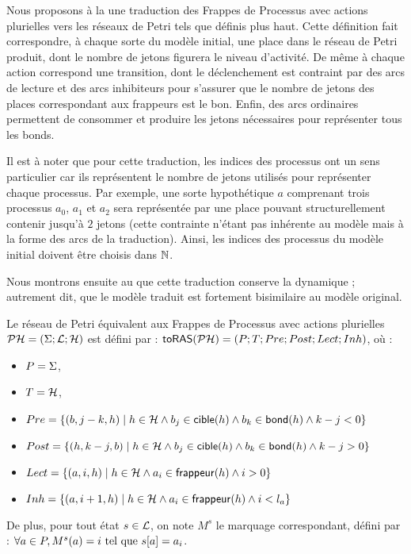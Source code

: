 Nous proposons à la  une traduction des Frappes de Processus avec actions
plurielles vers les réseaux de Petri tels que définis plus haut.
Cette définition fait correspondre, à chaque sorte du modèle initial,
une place dans le réseau de Petri produit,
dont le nombre de jetons figurera le niveau d'activité.
De même à chaque action correspond une transition, dont le déclenchement
est contraint par des arcs de lecture et des arcs inhibiteurs pour s'assurer
que le nombre de jetons des places correspondant aux frappeurs est le bon.
Enfin, des arcs ordinaires permettent de consommer et produire les jetons
nécessaires pour représenter tous les bonds.

Il est à noter que pour cette traduction, les indices des processus ont un sens particulier
car ils représentent le nombre de jetons utilisés pour représenter chaque processus.
Par exemple, une sorte hypothétique $a$ comprenant trois processus $a_0$, $a_1$ et $a_2$
sera représentée par une place pouvant structurellement contenir jusqu'à $2$ jetons
(cette contrainte n'étant pas inhérente au modèle mais à la forme des arcs de la traduction).
Ainsi, les indices des processus du modèle initial doivent être choisis dans $\mathbb{N}$.

Nous montrons ensuite au  que cette traduction
conserve la dynamique ;
autrement dit, que le modèle traduit est fortement bisimilaire au modèle original.

\begin{definition}
  Le réseau de Petri équivalent aux Frappes de Processus
  avec actions plurielles $\mathcal{PH} = (\Sigma; \mathcal{L}; \mathcal{H})$
  est défini par : $\mathsf{toRAS}(\mathcal{PH}) = (P; T; Pre; Post; Lect; Inh)$, où :
  \begin{itemize}
    \item $P = \Sigma$,
    \item $T = \mathcal{H}$,
    \item $Pre = \{ (b, j-k, h) \mid h \in \mathcal{H} \wedge b_j \in \mathsf{cible}(h) \wedge
      b_k \in \mathsf{bond}(h) \wedge k-j < 0 \}$
    \item $Post = \{ (h, k-j, b) \mid h \in \mathcal{H} \wedge b_j \in \mathsf{cible}(h) \wedge
      b_k \in \mathsf{bond}(h) \wedge k-j > 0 \}$
    \item $Lect = \{ (a, i, h) \mid h \in \mathcal{H} \wedge a_i \in \mathsf{frappeur}(h) \wedge i > 0 \}$
    \item $Inh = \{ (a, i+1, h) \mid h \in \mathcal{H} \wedge a_i \in \mathsf{frappeur}(h) \wedge i < l_a \}$
  \end{itemize}
  De plus, pour tout état $s \in \mathcal{L}$, on note
  $M^s$ le marquage correspondant, défini par :
  $\forall a \in P, M^s(a) = i \text{ tel que } {s[a]} = a_i$.
\end{definition}

